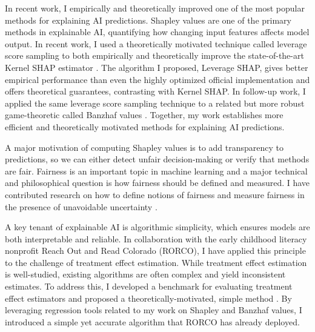 \documentclass[11pt]{article}
\begin{document}
{In recent work, I empirically and theoretically improved one of the most popular methods for explaining AI predictions. Shapley values are one of the primary methods in explainable AI, quantifying how changing input features affects model output.
In recent work, I used a theoretically motivated technique called leverage score sampling to both empirically and theoretically improve the state-of-the-art Kernel SHAP estimator \cite{musco2024leverage}. The algorithm I proposed, Leverage SHAP, gives better empirical performance than even the highly optimized official implementation and offers theoretical guarantees, contrasting with Kernel SHAP. In follow-up work, I applied the same leverage score sampling technique to a related but more robust game-theoretic called Banzhaf values \cite{liu2024kernel}. Together, my work establishes more efficient and theoretically motivated methods for explaining AI predictions.

A major motivation of computing Shapley values is to add transparency to predictions, so we can either detect unfair decision-making or verify that methods are fair. Fairness is an important topic in machine learning and a major technical and philosophical question is how fairness should be defined and measured. I have contributed research on how to define notions of fairness \cite{rosenblatt2023counterfactual} and measure fairness in the presence of unavoidable uncertainty \cite{witter2024fairlyuncertain}.

A key tenant of explainable AI is algorithmic simplicity, which ensures models are both interpretable and reliable. In collaboration with the early childhood literacy nonprofit Reach Out and Read Colorado (RORCO), I have applied this principle to the challenge of treatment effect estimation. While treatment effect estimation is well-studied, existing algorithms are often complex and yield inconsistent estimates. To address this, I developed a benchmark for evaluating treatment effect estimators and proposed a theoretically-motivated, simple method \cite{witter2024benchmarking}. By leveraging regression tools related to my work on Shapley and Banzhaf values, I introduced a simple yet accurate algorithm that RORCO has already deployed.

}
\end{document}
